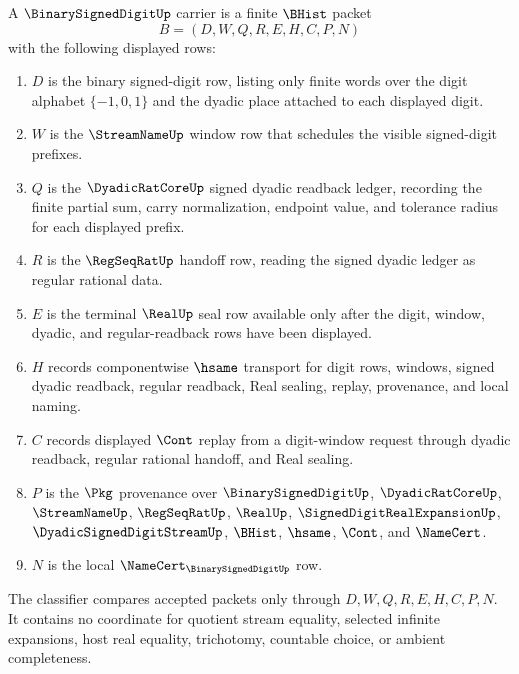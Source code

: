 \begin{definition}
\label{def:binary-signed-digit-carrier}
A $\BinarySignedDigitUp$ carrier is a finite $\BHist$ packet
$$
B=(D,W,Q,R,E,H,C,P,N)
$$
with the following displayed rows:
\begin{enumerate}
\item $D$ is the binary signed-digit row, listing only finite words over the digit alphabet $\{-1,0,1\}$ and the dyadic place attached to each displayed digit.
\item $W$ is the $\StreamNameUp$ window row that schedules the visible signed-digit prefixes.
\item $Q$ is the $\DyadicRatCoreUp$ signed dyadic readback ledger, recording the finite partial sum, carry normalization, endpoint value, and tolerance radius for each displayed prefix.
\item $R$ is the $\RegSeqRatUp$ handoff row, reading the signed dyadic ledger as regular rational data.
\item $E$ is the terminal $\RealUp$ seal row available only after the digit, window, dyadic, and regular-readback rows have been displayed.
\item $H$ records componentwise $\hsame$ transport for digit rows, windows, signed dyadic readback, regular readback, Real sealing, replay, provenance, and local naming.
\item $C$ records displayed $\Cont$ replay from a digit-window request through dyadic readback, regular rational handoff, and Real sealing.
\item $P$ is the $\Pkg$ provenance over $\BinarySignedDigitUp$, $\DyadicRatCoreUp$, $\StreamNameUp$, $\RegSeqRatUp$, $\RealUp$, $\SignedDigitRealExpansionUp$, $\DyadicSignedDigitStreamUp$, $\BHist$, $\hsame$, $\Cont$, and $\NameCert$.
\item $N$ is the local $\NameCert_{\BinarySignedDigitUp}$ row.
\end{enumerate}
The classifier compares accepted packets only through $D,W,Q,R,E,H,C,P,N$. It contains no coordinate for quotient stream equality, selected infinite expansions, host real equality, trichotomy, countable choice, or ambient completeness.
\end{definition}

